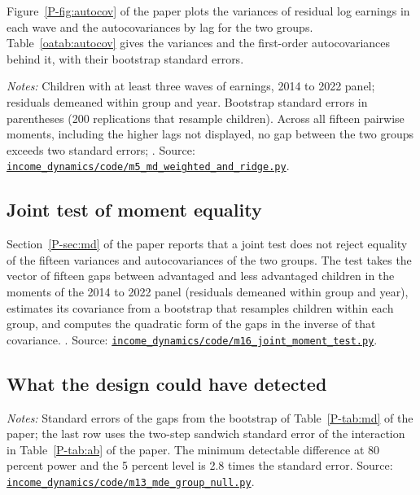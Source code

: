 \documentclass[11pt]{article}
\numberwithin{equation}{section}
\newcommand{\repourl}{https://github.com/JiachenJin1001/family-background-earnings-china}
\newcommand{\code}[1]{\href{\repourl/blob/main/#1}{\nolinkurl{#1}}}
\begin{document}
Figure~\ref{P-fig:autocov} of the paper plots the variances of residual
log earnings in each wave and the autocovariances by lag for the two
groups. Table~\ref{oatab:autocov} gives the variances and the
first-order autocovariances behind it, with their bootstrap standard
errors.

\begin{table}[H]
\centering
\small
\caption{Empirical autocovariances of residual log earnings, pooled and by group.}
\label{oatab:autocov}

\par\smallskip
\begin{minipage}{0.9\textwidth}
\footnotesize\emph{Notes:} Children with at least three waves of earnings, 2014 to 2022 panel; residuals demeaned within group and year. Bootstrap standard errors in parentheses (200 replications that resample children). Across all fifteen pairwise moments, including the higher lags not displayed, no gap between the two groups exceeds two standard errors; . Source:
\code{income_dynamics/code/m5_md_weighted_and_ridge.py}.
\end{minipage}
\end{table}

\subsection{Joint test of moment equality}
\label{oa:jointtest}

Section~\ref{P-sec:md} of the paper reports that a joint test does not
reject equality of the fifteen variances and autocovariances of the two
groups. The test takes the vector of fifteen gaps between advantaged
and less advantaged children in the moments of the 2014 to 2022 panel
(residuals demeaned within group and year), estimates its covariance
from a bootstrap that resamples children within each group, and computes the quadratic form of the gaps in the inverse of that covariance.
. Source:
\code{income_dynamics/code/m16_joint_moment_test.py}.

\subsection{What the design could have detected}

\begin{table}[H]
\centering
\small
\caption{Minimum detectable differences between the two groups.}
\label{oatab:mde}

\par\smallskip
\begin{minipage}{0.92\textwidth}
\footnotesize\emph{Notes:} Standard errors of the gaps from the
bootstrap of Table~\ref{P-tab:md} of the paper; the last row uses the
two-step sandwich standard error of the interaction in
Table~\ref{P-tab:ab} of the paper. The minimum detectable difference at
80 percent power and the 5 percent level is 2.8 times the standard
error. Source: \code{income_dynamics/code/m13_mde_group_null.py}.
\end{minipage}
\end{table}
\end{document}
